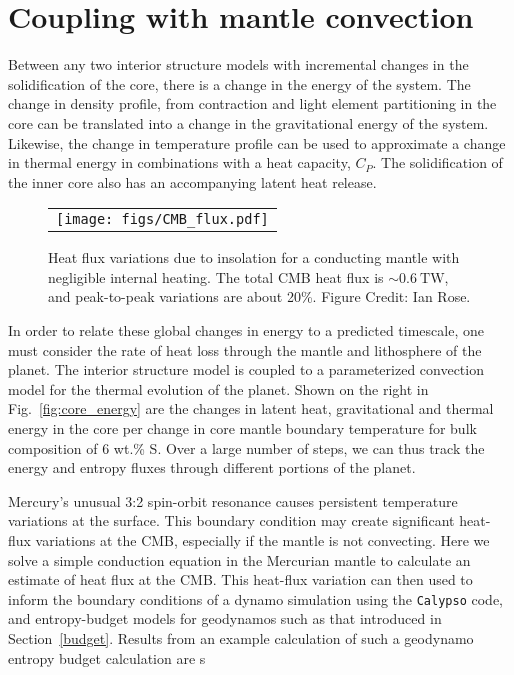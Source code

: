 \section{Coupling with mantle convection}


Between any two interior structure models with incremental changes in the
solidification of the core, there is a change in the energy of the system. The change
in density profile, from contraction and light element partitioning in the core can
be translated into a change in the gravitational energy of the system. Likewise, the
change in temperature profile can be used to approximate a change in thermal energy
in combinations with a heat capacity, $C_P$. The solidification of the inner core
also has an accompanying latent heat release.  \begin{figure}[h] %
   \centering
\begin{tabular}{c}
 \texttt{[image: figs/CMB\_flux.pdf]} 
\end{tabular}
\caption{ Heat flux variations due to insolation for a conducting mantle with
    negligible internal heating. The total CMB heat flux is $\sim 0.6~\mathrm{TW}$,
and peak-to-peak variations are about 20\%. Figure Credit: Ian Rose.}
\label{fig:flux}
\end{figure}

In order to relate these global
changes in energy to a predicted timescale, one must consider the rate of heat loss
through the mantle and lithosphere of the planet.
The interior structure model is coupled to a parameterized convection model
\citep{Stevenson1986} for
the thermal evolution of the planet. Shown on the right in Fig.~\ref{fig:core_energy}
are the changes in latent heat, gravitational and thermal energy in the core per
change in core mantle boundary temperature for bulk composition of 6 wt.\% S. Over a
large number of steps, we can thus track the energy and entropy fluxes through
different portions of the planet.

Mercury's unusual 3:2 spin-orbit resonance causes persistent temperature variations
at the surface.  This boundary condition may create significant heat-flux variations
at the CMB, especially if the mantle is not convecting.  Here we solve a simple
conduction equation in the Mercurian mantle to calculate an estimate of heat flux at
the CMB.  This heat-flux variation can then used to inform the boundary conditions of
a dynamo simulation using the \texttt{Calypso} code, and entropy-budget models for
geodynamos such as that introduced in Section~\ref{budget}. Results from an example
calculation of such a geodynamo entropy budget calculation are s



